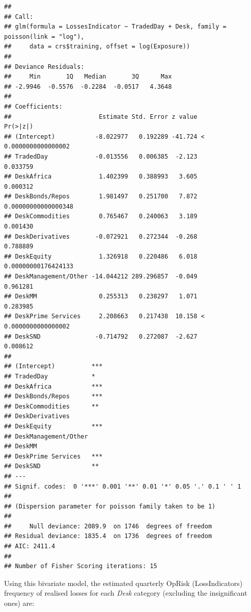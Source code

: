 \documentclass[]{article}
\begin{document}
\singlespacing

\begin{verbatim}
## 
## Call:
## glm(formula = LossesIndicator ~ TradedDay + Desk, family = poisson(link = "log"), 
##     data = crs$training, offset = log(Exposure))
## 
## Deviance Residuals: 
##     Min       1Q   Median       3Q      Max  
## -2.9946  -0.5576  -0.2284  -0.0517   4.3648  
## 
## Coefficients:
##                        Estimate Std. Error z value             Pr(>|z|)
## (Intercept)           -8.022977   0.192289 -41.724 < 0.0000000000000002
## TradedDay             -0.013556   0.006385  -2.123             0.033759
## DeskAfrica             1.402399   0.388993   3.605             0.000312
## DeskBonds/Repos        1.981497   0.251700   7.872  0.00000000000000348
## DeskCommodities        0.765467   0.240063   3.189             0.001430
## DeskDerivatives       -0.072921   0.272344  -0.268             0.788889
## DeskEquity             1.326918   0.220486   6.018  0.00000000176424133
## DeskManagement/Other -14.044212 289.296857  -0.049             0.961281
## DeskMM                 0.255313   0.238297   1.071             0.283985
## DeskPrime Services     2.208663   0.217438  10.158 < 0.0000000000000002
## DeskSND               -0.714792   0.272087  -2.627             0.008612
##                         
## (Intercept)          ***
## TradedDay            *  
## DeskAfrica           ***
## DeskBonds/Repos      ***
## DeskCommodities      ** 
## DeskDerivatives         
## DeskEquity           ***
## DeskManagement/Other    
## DeskMM                  
## DeskPrime Services   ***
## DeskSND              ** 
## ---
## Signif. codes:  0 '***' 0.001 '**' 0.01 '*' 0.05 '.' 0.1 ' ' 1
## 
## (Dispersion parameter for poisson family taken to be 1)
## 
##     Null deviance: 2089.9  on 1746  degrees of freedom
## Residual deviance: 1835.4  on 1736  degrees of freedom
## AIC: 2411.4
## 
## Number of Fisher Scoring iterations: 15
\end{verbatim}

\doublespacing

Using this bivariate model, the estimated quarterly OpRisk
(LossIndicators) frequency of realised losses for each \emph{Desk}
category (excluding the insignificant ones) are:
\end{document}
